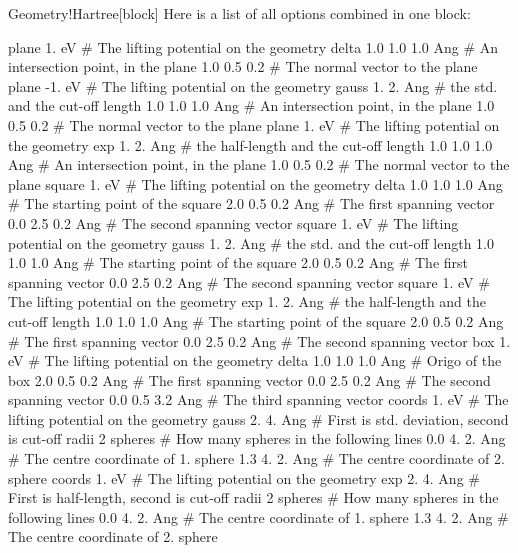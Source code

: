 \begin{fdfentry}{Geometry!Hartree}[block]
  Here is a list of all options combined in one block:
  \begin{fdfexample}
 plane   1. eV       # The lifting potential on the geometry
   delta
    1.0 1.0 1.0 Ang  # An intersection point, in the plane
    1.0 0.5 0.2      # The normal vector to the plane
 plane  -1. eV       # The lifting potential on the geometry
   gauss 1. 2.  Ang  # the std. and the cut-off length
    1.0 1.0 1.0 Ang  # An intersection point, in the plane
    1.0 0.5 0.2      # The normal vector to the plane
 plane   1. eV       # The lifting potential on the geometry
   exp 1. 2. Ang     # the half-length and the cut-off length
    1.0 1.0 1.0 Ang  # An intersection point, in the plane
    1.0 0.5 0.2      # The normal vector to the plane
 square  1. eV       # The lifting potential on the geometry
   delta
    1.0 1.0 1.0 Ang  # The starting point of the square
    2.0 0.5 0.2 Ang  # The first spanning vector
    0.0 2.5 0.2 Ang  # The second spanning vector
 square  1. eV       # The lifting potential on the geometry
   gauss 1. 2. Ang   # the std. and the cut-off length
    1.0 1.0 1.0 Ang  # The starting point of the square
    2.0 0.5 0.2 Ang  # The first spanning vector
    0.0 2.5 0.2 Ang  # The second spanning vector
 square  1. eV       # The lifting potential on the geometry
   exp 1. 2. Ang     # the half-length and the cut-off length
    1.0 1.0 1.0 Ang  # The starting point of the square
    2.0 0.5 0.2 Ang  # The first spanning vector
    0.0 2.5 0.2 Ang  # The second spanning vector
 box  1. eV          # The lifting potential on the geometry
   delta
    1.0 1.0 1.0 Ang  # Origo of the box
    2.0 0.5 0.2 Ang  # The first spanning vector
    0.0 2.5 0.2 Ang  # The second spanning vector
    0.0 0.5 3.2 Ang  # The third spanning vector
 coords 1. eV        # The lifting potential on the geometry
    gauss 2. 4. Ang  # First is std. deviation, second is cut-off radii
       2 spheres     # How many spheres in the following lines
       0.0 4. 2. Ang # The centre coordinate of 1. sphere
       1.3 4. 2. Ang # The centre coordinate of 2. sphere
 coords 1. eV        # The lifting potential on the geometry
    exp 2. 4. Ang    # First is half-length, second is cut-off radii
       2 spheres     # How many spheres in the following lines
       0.0 4. 2. Ang # The centre coordinate of 1. sphere
       1.3 4. 2. Ang # The centre coordinate of 2. sphere
     \end{fdfexample}
     
\end{fdfentry}

